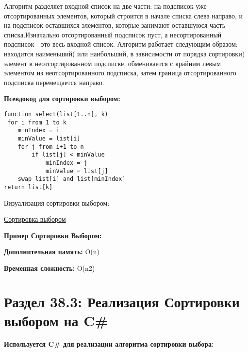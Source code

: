 \vspace{\baselineskip}
Алгоритм разделяет входной список на две части: на подсписок уже отсортированных элементов, который строится в начале списка слева направо, и на подсписок оставшихся элементов, которые занимают оставшуюся часть списка.Изначально отсортированный подсписок пуст, а несортированный подсписок - это весь входной список. Алгоритм работает следующим образом: находится наименьший( или наибольший, в зависимости от порядка сортировки) элемент в неотсортированном подсписке, обменивается с крайним левым элементом из неотсортированного подсписка, затем граница отсортированного подсписка перемещается направо.

\vspace{\baselineskip}
\textbf{Псевдокод для сортировки выбором:}

\vspace{\baselineskip}
\begin{tcolorbox}
\begin{verbatim} 
function select(list[1..n], k)
 for i from 1 to k
    minIndex = i
    minValue = list[i]
    for j from i+1 to n
        if list[j] < minValue
            minIndex = j
            minValue = list[j]
    swap list[i] and list[minIndex]
return list[k]

\end{verbatim}
\end{tcolorbox}

\vspace{\baselineskip}
Визуализация сортировки выбором:

\vspace{\baselineskip}
\href{https://i.stack.imgur.com/LZepY.gif}{\underline{Сортировка выбором}}

\vspace{\baselineskip}
\textbf{Пример Сортировки Выбором:}

\vspace{\baselineskip}

\vspace{\baselineskip}
\textbf{Дополнительная память:} O(n)

\textbf{Временная сложность:} O(n\^2)

\section*{Раздел 38.3: Реализация Сортировки выбором на C\#}

\textbf{Используется C\# для реализации алгоритма сортировки выбора:}


